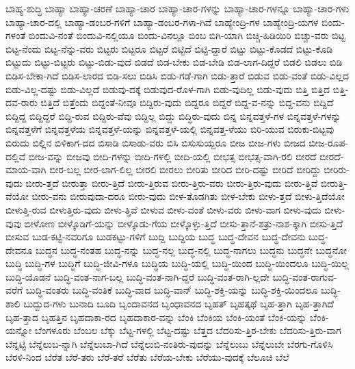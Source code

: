 {ಬಾಹ್ಯ-ಶುದ್ಧಿ
ಬಾಹ್ಯಾ
ಬಾಹ್ಯಾ-ಚರಣೆ
ಬಾಹ್ಯಾ-ಚಾರ
ಬಾಹ್ಯಾ-ಚಾರ-ಗಳನ್ನು
ಬಾಹ್ಯಾ-ಚಾರ-ಗಳನ್ನೂ
ಬಾಹ್ಯಾ-ಚಾರ-ಗಳು
ಬಾಹ್ಯಾ-ಚಾರ-ದಲ್ಲಿ
ಬಾಹ್ಯಾ-ಡಂಬರ-ಗಳಿಗೆ
ಬಾಹ್ಯಾ-ಡಂಬರ-ಗಳಾ-ಗಿವೆ
ಬಾಹ್ಯೇಂದ್ರಿ-ಗಳ
ಬಾಹ್ಯೇಂದ್ರಿ-ಯಗಳ
ಬಿಂದು-ಗಳಂತೆ
ಬಿಂದುವಿ-ನಂತೆ
ಬಿಂದುವಿ-ನಲ್ಲಿಯೂ
ಬಿಂದು-ವಿನಲ್ಲೂ
ಬಿಂಬ
ಬಿಗಿ-ಯಾಗಿ
ಬಿಚ್ಚಿ-ಹಿಡಿಯಿರಿ
ಬಿಚ್ಚು-ವರು
ಬಿಟ್ಟ
ಬಿಟ್ಟ-ನೆಂದು
ಬಿಟ್ಟ-ನೆನ್ನು-ವರು
ಬಿಟ್ಟರು
ಬಿಟ್ಟರೂ
ಬಿಟ್ಟರೆ
ಬಿಟ್ಟಿದೆ
ಬಿಟ್ಟಿ-ದ್ದಾರೆ
ಬಿಟ್ಟು
ಬಿಟ್ಟು-ಕೊಡದೆ
ಬಿಟ್ಟು-ಕೊಡಿ
ಬಿಟ್ಟುದು
ಬಿಟ್ಟು-ಬಿಟ್ಟರು
ಬಿಟ್ಟು-ಬಿಡು-ವುದೆ
ಬಿಡದೆ
ಬಿಡ-ಬೇಕು
ಬಿಡ-ಬೇಡಿ
ಬಿಡ-ಲಾಗ-ದಿದ್ದರೆ
ಬಿಡಲಿ
ಬಿಡಲು
ಬಿಡಿ
ಬಿಡಿಸ-ಬೇಕಾ-ಗಿದೆ
ಬಿಡಿಸ-ಲಾರದ
ಬಿಡಿ-ಸಲು
ಬಿಡಿಸಿ
ಬಿಡು-ಗಡೆ-ಗಾಗಿ
ಬಿಡು-ತ್ತಾರೆ
ಬಿಡುವ
ಬಿಡು-ವಂತೆ
ಬಿಡು-ವಿಲ್ಲದ
ಬಿಡು-ವಿಲ್ಲ-ದಷ್ಟು
ಬಿಡು-ವಿಲ್ಲದೆ
ಬಿಡುವು-ದಕ್ಕೆ
ಬಿಡುವುದ-ರೊಳ-ಗಾಗಿ
ಬಿಡು-ವುದಿಲ್ಲ
ಬಿಡು-ವುದು
ಬಿತ್ತಿ
ಬಿತ್ತಿದ
ಬಿತ್ತಿ-ದವ-ರಾರು
ಬಿತ್ತಿದೆ
ಬಿತ್ತೆಂದು
ಬಿದ್ದಂತೆ-ನೀವೂ
ಬಿದ್ದಿರು-ವುದು
ಬಿದ್ದರೂ
ಬಿದ್ದರೆ
ಬಿದ್ದ-ವ-ನನ್ನು
ಬಿದ್ದ-ವನು
ಬಿದ್ದಿದೆ
ಬಿದ್ದಿದ್ದ
ಬಿದ್ದಿದ್ದರೆ
ಬಿದ್ದಿ-ರುವ
ಬಿದ್ದಿರು-ವೆವು
ಬಿದ್ದಿಲ್ಲ
ಬಿದ್ದು
ಬಿದ್ಧಿರು-ವುದು
ಬಿನ್ನ
ಬಿನ್ನವತ್ತಳೆ-ಗಳ
ಬಿನ್ನವತ್ತಳೆ-ಗಳನ್ನು
ಬಿನ್ನವತ್ತಳೆಗೆ
ಬಿನ್ನವತ್ತಳೆಯ
ಬಿನ್ನವತ್ತಳೆ-ಯನ್ನು
ಬಿನ್ನವತ್ತಳೆ-ಯಲ್ಲಿ
ಬಿನ್ನವತ್ತ-ಳೆಯು
ಬಿರಿ-ಯುವ
ಬಿರುಕು-ಬಿಟ್ಟವು
ಬಿರುದು
ಬಿಲ್ಲಿನ
ಬಿಳಿಕಾಗ-ದದ
ಬಿಸಾಡಿ
ಬಿಸಾಡು-ವರು
ಬಿಸಿ
ಬಿಸುಸುಯ್ದರೂ
ಬೀಜ
ಬೀಜ-ಗಳು
ಬೀಜದ
ಬೀಜ-ರೂಪ-ದಲ್ಲಿವೆ
ಬೀಜ-ವನ್ನು
ಬೀಜವು
ಬೀದಿ-ಗಳನ್ನು
ಬೀದಿ-ಗಳಲ್ಲಿ
ಬೀದಿ-ಯಲ್ಲಿ
ಬೀಭತ್ಸ
ಬೀಭತ್ಸ-ವಾಗಿ-ರಲಿ
ಬೀರದೆ
ಬೀರದೆ-ಮಾಯ-ವಾಗಿ
ಬೀರ-ಬಲ್ಲ
ಬೀರ-ಲಾಗ-ಲಿಲ್ಲ
ಬೀರಲಿ
ಬೀರಲು
ಬೀರಿತು
ಬೀರಿದ
ಬೀರಿ-ದಷ್ಟು
ಬೀರಿದೆ
ಬೀರಿದ್ದು
ಬೀರಿರು-ವುದು
ಬೀರು-ತ್ತದೆ
ಬೀರುತ್ತಾ
ಬೀರು-ತ್ತಿದೆ
ಬೀರು-ತ್ತಿರುವ
ಬೀರು-ತ್ತಿರು-ವರು
ಬೀರು-ತ್ತಿರು-ವುದು
ಬೀರು-ತ್ತಿವೆ
ಬೀರುತ್ತಿ-ವೆಯೋ
ಬೀರು-ವನು
ಬೀರುವುದಾ-ದರೂ
ಬೀರು-ವುದು
ಬೀಳ-ತೊಡಗಿತು
ಬೀಳ-ಬೇಕು
ಬೀಳು-ತ್ತದೆ
ಬೀಳು-ತ್ತಿದೆಯೋ
ಬೀಳುತ್ತಿ-ರುವ
ಬೀಳುತ್ತಿರು-ವುದು
ಬೀಳು-ತ್ತಿವೆ
ಬೀಳುವ
ಬೀಳು-ವಂತೆ
ಬೀಳು-ವರು
ಬೀಳು-ವಾಗ
ಬೀಳು-ವುದು
ಬೀಳು-ವುವು
ಬೀಳೋಣ
ಬೀಳ್ಕೊಡಿಗೆ-ಯನ್ನು
ಬೀಳ್ಕೊಡು-ಗೆಯ
ಬೀಳ್ಕೊಳ್ಳು-ತ್ತಿದೆ
ಬೀಸು-ತ್ತಾನೆ-ಶತ್ರು-ನಾಶ-ಕ್ಕಾಗಿ
ಬೀಸು-ತ್ತಿದೆ
ಬೀಸುವ
ಬುಡ-ಕಟ್ಟಿ-ನವರಿಗೂ
ಬುಡಕಟ್ಟು-ಗಳಿಗೆ
ಬುದ್ದಿ
ಬುದ್ದಿಯ
ಬುದ್ಧ
ಬುದ್ಧ-ದೇವನ
ಬುದ್ಧ-ದೇವನು
ಬುದ್ಧ-ದೇವನೂ
ಬುದ್ಧನ
ಬುದ್ಧ-ನಂತಹ
ಬುದ್ಧ-ನನ್ನು
ಬುದ್ಧ-ನಲ್ಲ
ಬುದ್ಧ-ನಲ್ಲಿ
ಬುದ್ಧ-ನಾಗಲು
ಬುದ್ಧನು
ಬುದ್ಧನೇ
ಬುದ್ಧನೋ
ಬುದ್ಧಿ
ಬುದ್ಧಿ-ಗಳ
ಬುದ್ಧಿಗೆ
ಬುದ್ಧಿ-ಜೀವಿ-ಗಳೂ
ಬುದ್ಧಿಯ
ಬುದ್ಧಿ-ಯಲ್ಲಿ
ಬುದ್ಧಿ-ಯಿಂದ
ಬುದ್ಧಿ-ಯಿಂದಲೂ
ಬುದ್ಧಿ-ಯಿಲ್ಲ
ಬುದ್ಧಿ-ಯೊಡನೆ
ಬುದ್ಧಿ-ವಂತ-ನಾಗ-ಬಲ್ಲ
ಬುದ್ಧಿ-ವಂತ-ನಾಗಿ-ದ್ದರೆ
ಬುದ್ಧಿ-ವಂತ-ರಾಗಿ-ಲ್ಲದೇ
ಬುದ್ಧಿ-ವಂತ-ರಾಗುವ-ವರೆಗೆ
ಬುದ್ಧಿ-ವಂತರು
ಬುದ್ಧಿ-ವಂತಿಕೆ
ಬುದ್ಧಿ-ವಾದ
ಬುದ್ಧಿ-ವಾನ್
ಬುದ್ಧಿ-ಶಕ್ತಿ-ಯನ್ನು
ಬುದ್ಧಿ-ಶಕ್ತಿ-ಯಿಂದಲೂ
ಬುದ್ಧಿ-ಶಾಲಿ
ಬುದ್ಬುದ-ಗಳು
ಬುನಾದಿ
ಬೂದಿ
ಬೃಂದಾವನದ
ಬೃಂಧಾವನದ
ಬೃಹತ್
ಬೃಹತ್ಕಥೆ
ಬೃಹ-ತ್ತಾಗಿ
ಬೃಹ-ತ್ತಾಗಿದೆ
ಬೃಹ-ತ್ತಾದ
ಬೃಹತ್ತಿನ
ಬೃಹದಾಕಾ-ರದ
ಬೃಹದಾಕಾರ-ವನ್ನು
ಬೆಂಕಿ
ಬೆಂಕಿಯ
ಬೆಂಕಿ-ಯಂತೆ
ಬೆಂಕಿ-ಯನ್ನು
ಬೆಂಕಿ-ಯನ್ನೋ
ಬೆಂಗಳೂರು
ಬೆಂಬಲ
ಬೆಕ್ಕು
ಬೆಟ್ಟ-ಗಳಲ್ಲಿ
ಬೆಟ್ಟ-ದಷ್ಟು
ಬೆತ್ತದ
ಬೆದರಿಸು-ತ್ತಿರ-ಬೇಕು
ಬೆದರಿಸು-ತ್ತಿರು-ವಾಗ
ಬೆನ್ನಟ್ಟಿ
ಬೆನ್ನೆಲುಬ-ನ್ನಾಗಿ
ಬೆನ್ನೆಲುಬಾ-ಗಿದೆ
ಬೆನ್ನೆಲುಬಿ-ನಂತಿರು-ವುದನ್ನು
ಬೆನ್ನೆಲುಬು
ಬೆನ್ನೆಲುಬೇ
ಬೆರಗು-ಗೊಳಿಸಿ
ಬೆರಳಿ-ನಿಂದ
ಬೆರೆತ
ಬೆರೆ-ತರು
ಬೆರೆ-ತರೆ
ಬೆರೆತು
ಬೆರೆಯ-ಬೇಕು
ಬೆರೆಯು-ವುದಕ್ಕೆ
ಬೆಲೂಚಿ
ಬೆಲೆ
}
